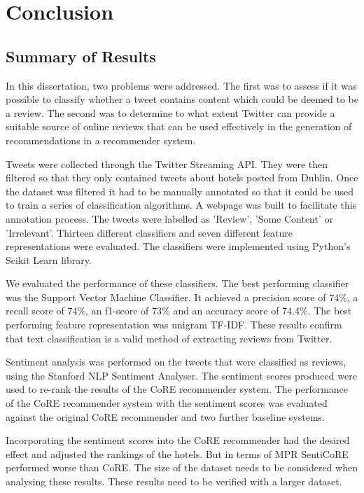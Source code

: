 \chapter{Conclusion}

\section{Summary of Results}

In this dissertation, two problems were addressed. The first was to assess if it was possible to classify whether a tweet contains content which could be deemed to be a review. The second was to determine to what extent Twitter can provide a suitable source of online reviews that can be used effectively in the generation of recommendations in a recommender system.

Tweets were collected through the Twitter Streaming API. They were then filtered so that they only contained tweets about hotels posted from Dublin. Once the dataset was filtered it had to be manually annotated so that it could be used to train a series of classification algorithms. A webpage was built to facilitate this annotation process. The tweets were labelled as 'Review', 'Some Content' or 'Irrelevant'. Thirteen different classifiers and seven different feature representations were evaluated. The classifiers were implemented using Python's Scikit Learn library.

We evaluated the performance of these classifiers. The best performing classifier was the Support Vector Machine Classifier. It achieved a precision score of 74\%, a recall score of 74\%, an f1-score of 73\% and an accuracy score of 74.4\%. The best performing feature representation was unigram TF-IDF. These results confirm that text classification is a valid method of extracting reviews from Twitter. 

Sentiment analysis was performed on the tweets that were classified as reviews, using the Stanford NLP Sentiment Analyser. The sentiment scores produced were used to re-rank the results of the CoRE recommender system. The performance of the CoRE recommender system with the sentiment scores was evaluated against the original CoRE recommender and two further baseline systems.

Incorporating the sentiment scores into the CoRE recommender had the desired effect and adjusted the rankings of the hotels. But in terms of MPR SentiCoRE performed worse than CoRE. The size of the dataset needs to be considered when analysing these results. These results need to be verified with a larger dataset.

